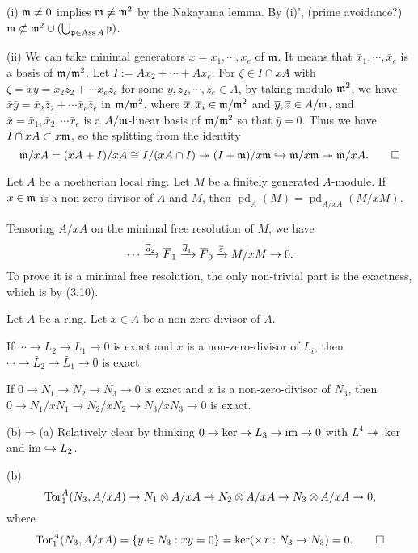 \documentclass{../../../small}
\renewcommand{\pd}{\operatorname{pd}}
\begin{document}
\begin{pf}
(i)
$\mathfrak{m}\ne0$ implies $\mathfrak{m}\ne\mathfrak{m}^2$ by the Nakayama lemma.
By (i)', (prime avoidance?) $\mathfrak{m}\not\subset \mathfrak{m}^2\cup(\bigcup_{\mathfrak{p}\in\operatorname{Ass}A}\mathfrak{p})$.

(ii)
We can take minimal generators $x=x_1,\cdots,x_e$ of $\mathfrak{m}$.
It means that $\bar x_1,\cdots,\bar x_e$ is a basis of $\mathfrak{m}/\mathfrak{m}^2$.
Let $I:=Ax_2+\cdots+Ax_e$.
For $\zeta\in I\cap xA$ with $\zeta=xy=x_2z_2+\cdots x_ez_e$ for some $y,z_2,\cdots,z_e\in A$, by taking modulo $\mathfrak{m}^2$, we have $\bar x\bar y=\bar x_2\bar z_2+\cdots\bar x_e\bar z_e$ in $\mathfrak{m}/\mathfrak{m}^2$, where $\overline x,\overline x_i\in\mathfrak{m}/\mathfrak{m}^2$ and $\overline y,\overline z\in A/\mathfrak{m}$, and $\bar x=\bar x_1,\bar x_2,\cdots\bar x_e$ is a $A/\mathfrak{m}$-linear basis of $\mathfrak{m}/\mathfrak{m}^2$ so that $\bar y=0$.
Thus we have $I\cap xA\subset x\mathfrak{m}$, so the splitting from the identity
\[\mathfrak{m}/xA=(xA+I)/xA\cong I/(xA\cap I)\twoheadrightarrow(I+\mathfrak{m})/x\mathfrak{m}\hookrightarrow\mathfrak{m}/x\mathfrak{m}\twoheadrightarrow\mathfrak{m}/xA.\qedhere\]
\end{pf}

\begin{thm*}
Let $A$ be a noetherian local ring.
Let $M$ be a finitely generated $A$-module.
If $x\in\mathfrak{m}$ is a non-zero-divisor of $A$ and $M$, then $\pd_A(M)=\pd_{A/xA}(M/xM)$.
\end{thm*}
\begin{pf}
Tensoring $A/xA$ on the minimal free resolution of $M$, we have
\[\cdots\xrightarrow{\overline d_2}\overline F_1\xrightarrow{\overline d_1}\overline F_0\xrightarrow{\overline {\varepsilon}}M/xM\to0.\]
To prove it is a minimal free resolution, the only non-trivial part is the exactness, which is by (3.10).
\end{pf}

\begin{lem*}[3.10]
Let $A$ be a ring.
Let $x\in A$ be a non-zero-divisor of $A$.
\begin{parts}
\item If $\cdots\to L_2\to L_1\to0$ is exact and $x$ is a non-zero-divisor of $L_i$, then $\cdots\to\bar L_2\to\bar L_1\to0$ is exact.
\item If $0\to N_1\to N_2\to N_3\to0$ is exact and $x$ is a non-zero-divisor of $N_3$, then $0\to N_1/xN_1\to N_2/xN_2\to N_3/xN_3\to0$ is exact.
\end{parts}
\end{lem*}
\begin{pf}
(b)$\Rightarrow$(a)
Relatively clear by thinking $0\to\ker\to L_3\to\operatorname{im}\to0$ with $L^4\twoheadrightarrow\ker$ and $\operatorname{im}\hookrightarrow L_2$.

(b)
\[\operatorname{Tor}_1^A(N_3,A/xA)\to N_1\otimes A/xA\to N_2\otimes A/xA\to N_3\otimes A/xA\to0,\]
where
\[\operatorname{Tor}_1^A(N_3,A/xA)=\{y\in N_3:xy=0\}=\ker(\times x:N_3\to N_3)=0.\qedhere\]
\end{pf}
\end{document}
